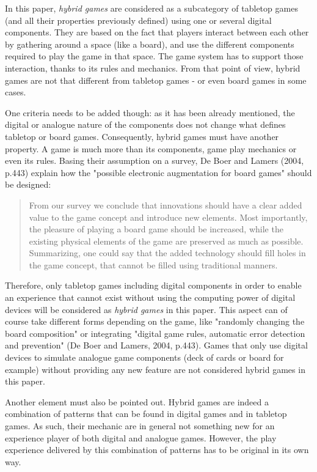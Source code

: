 In this paper, \textit{hybrid games} are considered as a subcategory of tabletop games (and all their properties previously defined) using one or several digital components. They are based on the fact that players interact between each other by gathering around a space (like a board), and use the different components required to play the game in that space. The game system has to support those interaction, thanks to its rules and mechanics. From that point of view, hybrid games are not that different from tabletop games - or even board games in some cases.

One criteria needs to be added though: as it has been already mentioned, the digital or analogue nature of the components does not change what defines tabletop or board games. Consequently, hybrid games must have another property. A game is much more than its components, game play mechanics or even its rules. Basing their assumption on a survey,  De Boer and Lamers (2004, p.443)\cite{chap:aug} explain how the "possible electronic augmentation for board games" should be designed:

\begin{quotation}
From our survey we conclude that innovations should have a clear added value to the game concept and introduce new elements. Most importantly, the pleasure of playing a board game should be increased, while the existing physical elements of the game are preserved as much as possible. Summarizing, one could say that the added technology should fill holes in the game concept, that cannot be filled using traditional manners.
\end{quotation}


Therefore, only tabletop games including digital components in order to enable an experience that cannot exist without using the computing power of digital devices will be considered as \textit{hybrid games} in this paper. This aspect can of course take different forms depending on the game, like "randomly changing the board composition" or integrating "digital game rules, automatic error detection and prevention" (De Boer and Lamers, 2004, p.443)\cite{chap:aug}. Games that only use digital devices to simulate analogue game components (deck of cards or board for example) without providing any new feature are not considered hybrid games in this paper.

Another element must also be pointed out. Hybrid games are indeed a combination of patterns that can be found in digital games and in tabletop games. As such, their mechanic are in general not something new for an experience player of both digital and analogue games. However, the play experience delivered by this combination of patterns has to be original in its own way.

